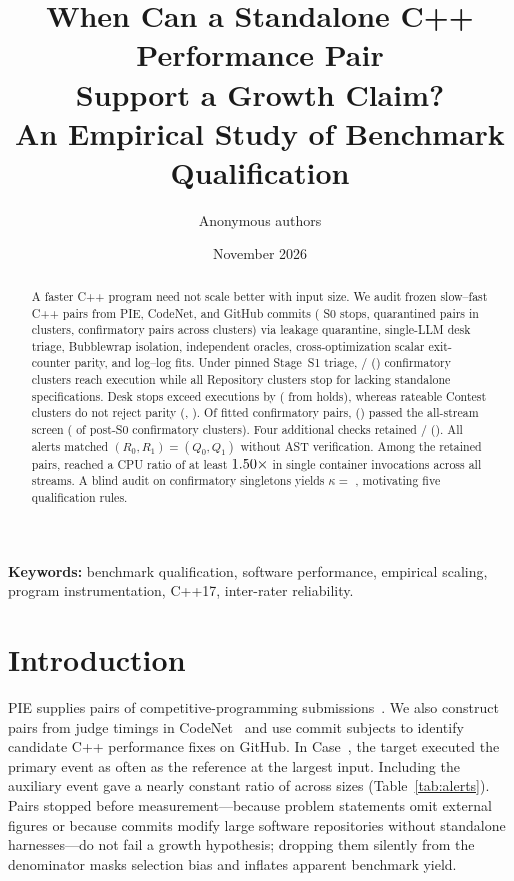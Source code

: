 \documentclass[11pt]{article}
\title{When Can a Standalone C++ Performance Pair\\
Support a Growth Claim?\\
An Empirical Study of Benchmark Qualification}
\author{Anonymous authors}
\date{November 2026}
\newcommand{\CaseRef}[1]{Case~#1}
\begin{document}
\maketitle

\begin{abstract}
A faster C++ program need not scale better with input size.
We audit \BenchPairs{} frozen slow--fast C++ pairs from PIE, CodeNet, and \BenchGitHub{} GitHub commits (\BenchIntakeStopsN{} S0 stops, \BenchQuarPairsN{} quarantined pairs in \BenchQuarClustersN{} clusters, \BenchConfPairsN{} confirmatory pairs across \BenchConfClustersN{} clusters) via leakage quarantine, single-LLM desk triage, Bubblewrap isolation, independent oracles, cross-optimization scalar exit-counter parity, and log--log fits.
Under pinned Stage~S1 triage, \BenchPOneCount{}/\BenchConfClustersN{} (\BenchPOnePct{}) confirmatory clusters reach execution while all \BenchConfRepoClustersN{} Repository clusters stop for lacking standalone specifications.
Desk stops exceed executions by \BenchPTwoDelta{} (\BenchPTwoHoldsShare{} from \BenchHeldUnratConfClustN{} holds), whereas rateable Contest clusters do not reject parity (\BenchSAThirteenDelta{}, \BenchSAThirteenP{}).
Of \BenchFittedClusters{} fitted confirmatory pairs, \BenchPThreeCount{} (\BenchPThreePct{}) passed the all-stream screen (\BenchSATwoPct{} of post-S0 confirmatory clusters). Four additional checks retained \BenchCoreFourN{}/\BenchFittedClusters{} (\BenchCoreFourPct{}). All \BenchPThreeCount{} alerts matched $(R_0,R_1)=(Q_0,Q_1)$ without AST verification. Among the retained pairs, \BenchRealizedCpuCoreN{} reached a CPU ratio of at least $1.50{}\times$ in single container invocations across all streams.
A blind audit on \BenchAuthConfN{} confirmatory singletons yields $\kappa =$ \BenchAuthConfBinK{}, motivating five qualification rules.
\end{abstract}

\noindent\textbf{Keywords:} benchmark qualification, software performance, empirical scaling, program instrumentation, C++17, inter-rater reliability.

\section{Introduction}
\label{sec:intro}

PIE supplies pairs of competitive-programming submissions~\cite{shypula2024pie}. We also construct pairs from judge timings in CodeNet~\cite{puri2021codenet} and use commit subjects to identify candidate C++ performance fixes on GitHub.
In \CaseRef{\BenchPosOneSixFour{}}, the target executed the primary event \BenchPosOneSixFourRatio{} as often as the reference at the largest input. Including the auxiliary event gave a nearly constant ratio of \BenchPosOneSixFourTotRatio{} across sizes (Table~\ref{tab:alerts}).
Pairs stopped before measurement---because problem statements omit external figures or because commits modify large software repositories without standalone harnesses---do not fail a growth hypothesis; dropping them silently from the denominator masks selection bias and inflates apparent benchmark yield.
\end{document}

